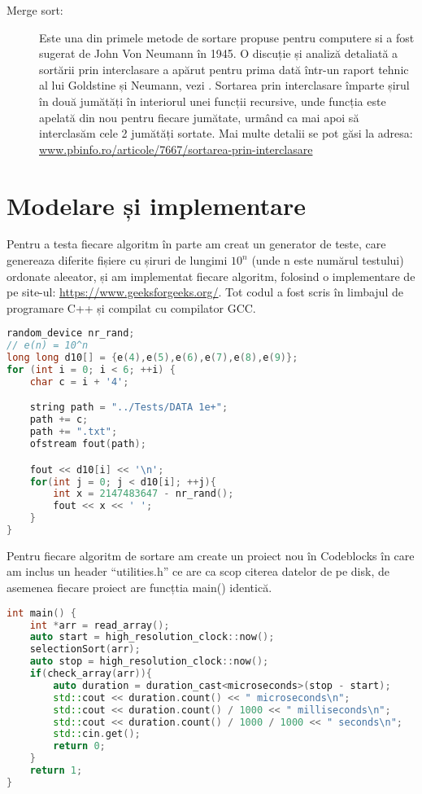 \documentclass[12pt]{article}
\begin{document}
\begin{itemize}
\begin{description}
    \item[Merge sort:]  Este una din primele metode de sortare propuse pentru computere si a fost sugerat de John Von Neumann în 1945. O discuție și analiză detaliată a sortării prin interclasare a apărut pentru prima dată într-un raport tehnic al lui Goldstine și Neumann, vezi \cite{10.1007/3-540-62592-5_74}. Sortarea prin interclasare împarte șirul în două jumătăți în interiorul unei funcții recursive, unde funcția este apelată din nou pentru fiecare jumătate, urmând ca mai apoi să interclasăm cele 2 jumătăți sortate. Mai multe detalii se pot găsi la adresa:\\ \url{www.pbinfo.ro/articole/7667/sortarea-prin-interclasare}
\end{description}
\end{itemize}

\section{Modelare și implementare}

Pentru a testa fiecare algoritm în parte am creat un generator de teste, care genereaza diferite fișiere cu șiruri de lungimi $10^n$ (unde n este numărul testului) ordonate aleeator, și  am implementat fiecare algoritm, folosind o implementare de pe site-ul: \url{https://www.geeksforgeeks.org/}. Tot codul a fost scris în limbajul de programare C++ și compilat cu compilator GCC.\\

\begin{lstlisting}[language=C++, caption={Generator teste}, label=cod:part]
random_device nr_rand;
// e(n) = 10^n
long long d10[] = {e(4),e(5),e(6),e(7),e(8),e(9)};
for (int i = 0; i < 6; ++i) {
    char c = i + '4';

    string path = "../Tests/DATA 1e+";
    path += c;
    path += ".txt";
    ofstream fout(path);

    fout << d10[i] << '\n';
    for(int j = 0; j < d10[i]; ++j){
        int x = 2147483647 - nr_rand();
        fout << x << ' ';
    }
}
\end{lstlisting}

\indent Pentru fiecare algoritm de sortare am create un proiect nou în Codeblocks în care am inclus un header “utilities.h” ce are ca scop citerea datelor de pe disk, de asemenea fiecare proiect are funcțtia main() identică.\\

\begin{lstlisting}[language=C++, caption={Funcţia main() a fiecărui proiect.}, label=cod:part]
int main() {
    int *arr = read_array();
    auto start = high_resolution_clock::now();
    selectionSort(arr);
    auto stop = high_resolution_clock::now();
    if(check_array(arr)){
        auto duration = duration_cast<microseconds>(stop - start);
        std::cout << duration.count() << " microseconds\n";
        std::cout << duration.count() / 1000 << " milliseconds\n";
        std::cout << duration.count() / 1000 / 1000 << " seconds\n";
        std::cin.get();
        return 0;
    }
    return 1;
}
\end{lstlisting}
\end{document}
